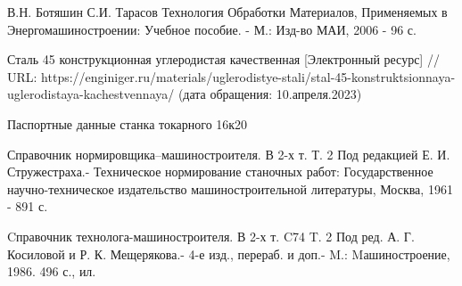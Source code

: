 \begingroup 
\renewcommand{\section}[2]{\anonsection{\uppercase{Библиографический список}}}
\begin{thebibliography}{00}

    В.Н. Б\lowercase{ОТЯШИН}
    С.И. Т\lowercase{АРАСОВ}
    Т\lowercase{ЕХНОЛОГИЯ} О\lowercase{БРАБОТКИ} М\lowercase{АТЕРИАЛОВ}, П\lowercase{РИМЕНЯЕМЫХ} в Э\lowercase{НЕРГОМАШИНОСТРОЕНИИ}: Учебное пособие. - М.: Изд-во МАИ, 2006 - 96 с.

    Сталь 45 конструкционная углеродистая качественная
    [Электронный ресурс] // 
    URL: https://enginiger.ru/materials/uglerodistye-stali/stal-45-konstruktsionnaya-uglerodistaya-kachestvennaya/
    (дата обращения: 10.апреля.2023)

    Паспортные данные станка токарного 16к20

    Справочник нормировщика–машиностроителя. В 2-х т. Т. 2 Под редакцией Е. И. Стружестраха.- Техническое нормирование станочных работ: Государственное научно-техническое издательство машиностроительной литературы, Москва, 1961 - 891 с.

    Cправочник технолога-машиностроителя. В 2-х т. C74 T. 2 Под ред. А. Г. Косиловой и Р. К. Мещерякова.- 4-е изд., перераб. и доп.- M.: Mашиностроение, 1986. 496 с., ил.

\end{thebibliography}
\endgroup

\clearpage